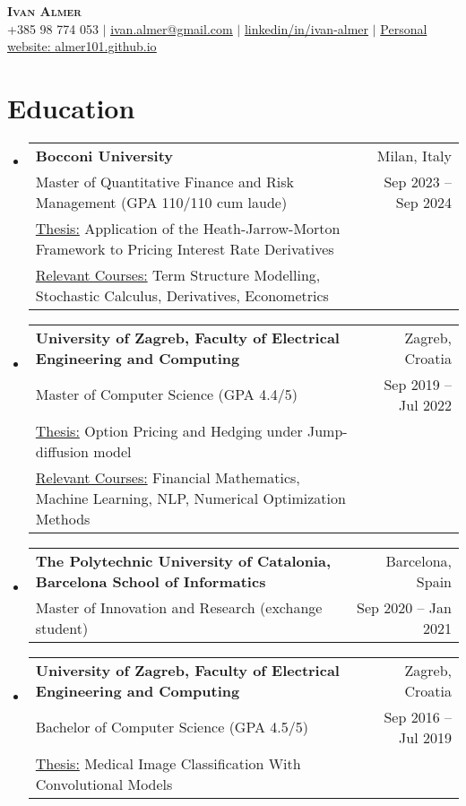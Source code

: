 \documentclass[letterpaper,11pt]{article}
\makeatletter
\newcommand{\resumeSubheading}[4]{
  \vspace{-2pt}\item
    \begin{tabular*}{0.97\textwidth}[t]{l@{\extracolsep{\fill}}r}
      \textbf{#1} & #2 \\
      \small #3 & \small #4 \\
    \end{tabular*}\vspace{-7pt}
}
\newcommand{\resumeSubheadingWithAdditional}[6]{
  \vspace{-2pt}\item
    \begin{tabular*}{0.97\textwidth}[t]{l@{\extracolsep{\fill}}r}
      \textbf{#1} & #2 \\
      \small #3 & \small #4 \\
      \small #5 \\
      \small #6
    \end{tabular*}\vspace{-7pt}
}
\newcommand{\resumeSubheadingWithAdditionall}[5]{
  \vspace{-2pt}\item
    \begin{tabular*}{0.97\textwidth}[t]{l@{\extracolsep{\fill}}r}
      \textbf{#1} & #2 \\
      \small #3 & \small #4 \\
      \small #5
    \end{tabular*}\vspace{-7pt}
}
\newcommand{\resumeSubHeadingListStart}{\begin{itemize}[leftmargin=0.15in, label={}]}
\newcommand{\resumeSubHeadingListEnd}{\end{itemize}}
\makeatother
\begin{document}

\begin{center}
    \textbf{\huge \scshape Ivan Almer} \\ \vspace{2pt}
    \small +385 98 774 053 $|$ \href{mailto:ivan.almer@gmail.com}{\underline{ivan.almer@gmail.com}} $|$ 
    \href{https://linkedin.com/in/ivan-almer/}{\underline{linkedin/in/ivan-almer}} $|$
    \href{https://almer101.github.io/intro.html}{Personal website: \underline{almer101.github.io}}
\end{center}

\vspace{-10pt}
\section{Education}
  \resumeSubHeadingListStart
    \resumeSubheadingWithAdditional
      {Bocconi University}{Milan, Italy}
      {Master of Quantitative Finance and Risk Management (GPA 110/110 cum laude)}{Sep 2023 -- Sep 2024}{\underline{Thesis:} Application of the Heath-Jarrow-Morton Framework to Pricing Interest Rate Derivatives}{\underline{Relevant Courses:} Term Structure Modelling, Stochastic Calculus, Derivatives, Econometrics}
    \resumeSubheadingWithAdditional
      {University of Zagreb, Faculty of Electrical Engineering and Computing}{Zagreb, Croatia}
      {Master of Computer Science (GPA 4.4/5)}{Sep 2019 -- Jul 2022}{\underline{Thesis:} Option Pricing and Hedging under Jump-diffusion model}
      {\underline{Relevant Courses:} Financial Mathematics, Machine Learning, NLP, Numerical Optimization Methods}
    \resumeSubheading 
      {The Polytechnic University of Catalonia, Barcelona School of Informatics}{Barcelona, Spain}
      {Master of Innovation and Research (exchange student)}{Sep 2020 -- Jan 2021}
    \resumeSubheadingWithAdditionall
      {University of Zagreb, Faculty of Electrical Engineering and Computing}{Zagreb, Croatia}
      {Bachelor of Computer Science (GPA 4.5/5)}{Sep 2016 -- Jul 2019}{\underline{Thesis:} Medical Image Classification With Convolutional Models}
  \resumeSubHeadingListEnd
\end{document}
